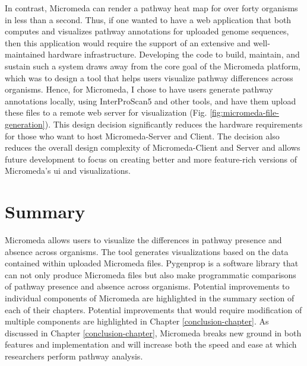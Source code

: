 In contrast, Micromeda can render a pathway heat map for over forty organisms in 
less than a second. Thus, if one wanted to have a web application that both 
computes and visualizes pathway annotations for uploaded genome sequences, then 
this application would require the support of an extensive and well-maintained 
hardware infrastructure. Developing the code to build, maintain, and sustain 
such a system draws away from the core goal of the Micromeda platform, which was 
to design a tool that helps users visualize pathway differences across 
organisms. Hence, for Micromeda, I chose to have users generate pathway 
annotations locally, using InterProScan5 and other tools, and have them upload 
these files to a remote web server for visualization (Fig. 
\ref{fig:micromeda-file-generation}). This design decision significantly reduces 
the hardware requirements for those who want to host Micromeda-Server and 
Client. The decision also reduces the overall design complexity of 
Micromeda-Client and Server and allows future development to focus on creating 
better and more feature-rich versions of Micromeda's \gls{ui} and 
visualizations.

\section{Summary} \label{introduction_summary}

Micromeda allows users to visualize the differences in pathway presence and 
absence across organisms. The tool generates visualizations based on the data 
contained within uploaded Micromeda files. Pygenprop is a software library that 
can not only produce Micromeda files but also make programmatic comparisons of 
pathway presence and absence across organisms. Potential improvements to 
individual components of Micromeda are highlighted in the summary section of 
each of their chapters. Potential improvements that would require modification 
of multiple components are highlighted in Chapter \ref{conclusion-chapter}. As 
discussed in Chapter \ref{conclusion-chapter}, Micromeda breaks new ground in 
both features and implementation and will increase both the speed and ease at 
which researchers perform pathway analysis.